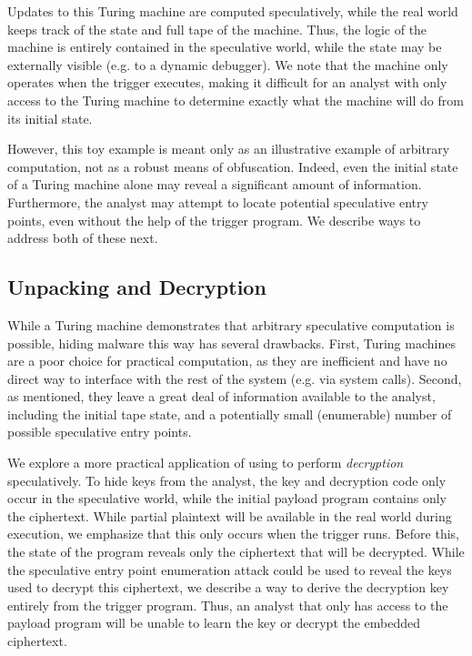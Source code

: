 Updates to this Turing machine are computed speculatively, while the real
world keeps track of the state and full tape of the machine. Thus, the logic of
the machine is entirely contained in the speculative world, while the state may
be externally visible (e.g. to a dynamic debugger). We note that the machine
only operates when the trigger executes, making it difficult for an analyst with
only access to the Turing machine to determine exactly what the machine will do
from its initial state.

However, this toy example is meant only as an illustrative example of arbitrary
computation, not as a robust means of obfuscation. Indeed, even the initial
state of a Turing machine alone may reveal a significant amount of information.
Furthermore, the analyst may attempt to locate potential speculative entry
points, even without the help of the trigger program. We describe ways to
address both of these next.


\subsection{Unpacking and Decryption}
\label{subsec:decryption}

While a Turing machine demonstrates that arbitrary speculative computation
is possible, hiding malware this way has several drawbacks. First, Turing
machines are a poor choice for practical computation, as they are inefficient
and have no direct way to interface with the rest of the system (e.g. via system
calls). Second, as mentioned, they leave a great deal of information available
to the analyst, including the initial tape state, and a potentially small
(enumerable) number of possible speculative entry points.

We explore a more practical application of using \speculake to perform
\emph{decryption} speculatively. To hide keys from the analyst, the key and decryption
code only occur in the speculative world, while the initial payload program
contains only the ciphertext. While partial plaintext will be available in the
real world during execution, we emphasize that this only occurs when the trigger
runs. Before this, the state of the program reveals only the ciphertext that
will be decrypted. While the speculative entry point enumeration attack could be
used to reveal the keys used to decrypt this ciphertext, we describe a way to
derive the decryption key entirely from the trigger program. Thus, an analyst
that only has access to the payload program will be unable to learn the key or
decrypt the embedded ciphertext.

